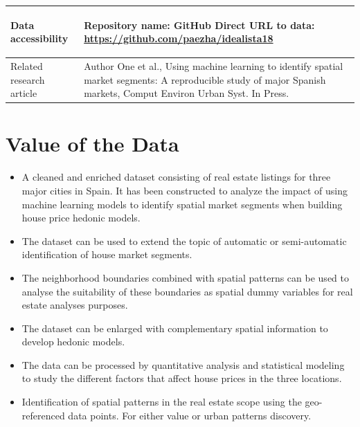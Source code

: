 \documentclass[times,final]{elsarticle}
\begin{document}
{\begin{longtable}{|p{33mm}|p{94mm}|}
%
%
\hline
\hypertarget{target1}
{Data accessibility}   & Repository name: GitHub\newline
                         Direct URL to data: \url{https://github.com/paezha/idealista18}\newline
                         \\
\hline
Related
research\newline
article                & Author One et al., Using machine learning to identify spatial market segments: A reproducible study of major Spanish markets, Comput Environ Urban Syst. In Press.\newline
\end{longtable}
}

\section*{Value of the Data}

\begin{itemize}
\itemsep=0pt
\parsep=0pt
  \item A cleaned and enriched dataset consisting of real estate listings for three major cities in Spain. It has been constructed to analyze the impact of using machine learning models to identify spatial market segments when building house price hedonic models.
  \item The dataset can be used to extend the topic of automatic or semi-automatic identification of house market segments.
    \item The neighborhood boundaries combined with spatial patterns can be used to analyse the suitability of these boundaries as spatial dummy variables for real estate analyses purposes.
  \item The dataset can be enlarged with complementary spatial information to develop hedonic models.
  \item The data can be processed by quantitative analysis and statistical modeling to study the different factors that affect house prices in the three locations.
  \item Identification of spatial patterns in the real estate scope using the geo-referenced data points. For either value or urban patterns discovery.
\end{itemize}
\end{document}
